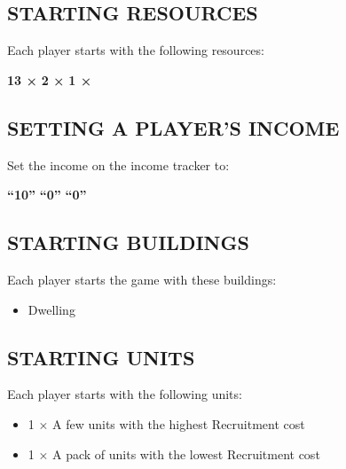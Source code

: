 \begin{multicols*}{2}
\subsection*{\MakeUppercase{Starting Resources}}
Each player starts with the following resources:
\begin{center}
    \textbf{13 ×}    \textbf{2 ×}      \textbf{1 ×} 
\end{center}
\subsection*{\MakeUppercase{Setting a Player's Income}}
Set the income on the income tracker to:
\begin{center}
    \textbf{“10”}    \textbf{“0”}      \textbf{“0”} 
\end{center}
\subsection*{\MakeUppercase{Starting Buildings}}
Each player starts the game with these buildings:
\begin{itemize}
    \item {} Dwelling
\end{itemize}
\subsection*{\MakeUppercase{Starting Units}}
Each player starts with the following units:
\begin{itemize}
    \item 1 × A few  units with the highest Recruitment cost
    \item 1 × A pack of  units with the lowest Recruitment cost
\end{itemize}

\end{multicols*}
